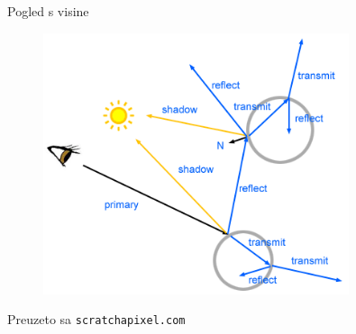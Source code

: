 \documentclass[9pt]{beamer}
\begin{document}
\begin{frame}{Pogled s visine}
\begin{figure}
	\includegraphics[width=0.8\textwidth]{./slike/rt-recursive.png}
\end{figure}
\tiny{Preuzeto sa \texttt{scratchapixel.com}}
\end{frame}
%
%
%
%
%	
%
\end{document}
